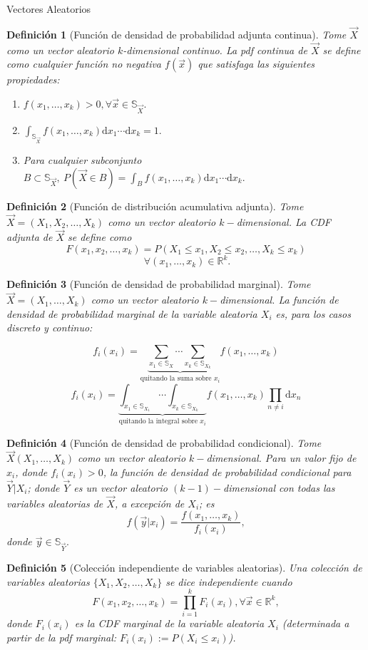 \documentclass{beamer}
\newtheorem{defi}{Definición}[section]
\begin{document}
\begin{frame}[allowframebreaks]{Vectores Aleatorios}
	\begin{defi}[Función de densidad de probabilidad adjunta continua]
		Tome $\vec{X}$ como un vector aleatorio $k$-dimensional continuo. La \textit{pdf} continua de $\vec{X}$ se define como cualquier función no negativa $f(\vec{x})$ que satisfaga las siguientes propiedades:
		\begin{enumerate}
			\item $f(x_1,\dots,x_k)>0, \forall \vec{x}\in\mathbb{S}_{\vec{X}}.$
			\item $\int_{\mathbb{S}_{\vec{X}}} f(x_1,\dots,x_k)\mathrm{d}x_1\cdots\mathrm{d}x_k=1.$
			\item Para cualquier subconjunto $B\subset\mathbb{S}_{\vec{X}},\ P(\vec{X}\in B)=\int_{B}f(x_1,\dots,x_k)\mathrm{d}x_1\cdots\mathrm{d}x_k.$
		\end{enumerate}
	\end{defi}
	
	\begin{defi}[Función de distribución acumulativa adjunta]
		Tome $\vec{X}=(X_1,X_2,\dots,X_k)$ como un vector aleatorio $k-$dimensional. La \textit{CDF} adjunta de $\vec{X}$ se define como
		$$F(x_1,x_2,\dots,x_k)=P(X_1\leq x_1, X_2\leq x_2,\dots, X_k\leq x_k)$$ $$\ \forall (x_1,\dots,x_k)\in\mathbb{R}^k.$$
	\end{defi}
	
	\begin{defi}[Función de densidad de probabilidad marginal]
		Tome $\vec{X}=(X_1,\dots,X_k)$ como un vector aleatorio $k-$dimensional. La función de densidad de probabilidad marginal de la variable aleatoria $X_i$ es, para los casos discreto y continuo:
		

		$$f_i(x_i)=\underbrace{\sum_{x_1\in\mathbb{S}_{X}}\cdots \sum_{x_k\in\mathbb{S}_{X_k}}}_{\text{quitando la suma sobre }x_i} f(x_1,\dots,x_k)$$
		$$f_i(x_i)=\underbrace{\int_{x_1\in\mathbb{S}_{X_1}}\cdots \int_{x_k\in\mathbb{S}_{X_k}}}_{\text{quitando la integral sobre }x_i} f(x_1,\dots,x_k)\prod_{n\neq i}\mathrm{d}x_n$$ 
	\end{defi}
	
	\begin{defi}[Función de densidad de probabilidad condicional]
		Tome $\vec{X}(X_1,\dots,X_k)$ como un vector aleatorio $k-$dimensional. Para un valor fijo de $x_i$, donde $f_i(x_i)>0$, la función de densidad de probabilidad condicional para $\vec{Y}|X_i$; donde $\vec{Y}$ es un vector aleatorio $(k-1)-$dimensional con todas las variables aleatorias de $\vec{X}$, a excepción de $X_i$; es
		$$f(\vec{y}|x_i)=\frac{f(x_1,\dots,x_k)}{f_i(x_i)},$$
		donde $\vec{y}\in\mathbb{S}_{\vec{Y}}.$
	\end{defi}
	\begin{defi}[Colección independiente de variables aleatorias]
	Una colección de variables aleatorias $\{ X_1,X_2,\dots, X_k\}$ se dice independiente cuando
	$$F(x_1,x_2,\dots,x_k)=\prod_{i=1}^k F_i(x_i), \forall\vec{x}\in\mathbb{R}^k,$$
	donde $F_i(x_i)$ es la \textit{CDF} marginal de la variable aleatoria $X_i$ (determinada a partir de la \textit{pdf} marginal: $F_i(x_i):=P(X_i\leq x_i)$).
	\end{defi}
	

\end{frame}
\end{document}
